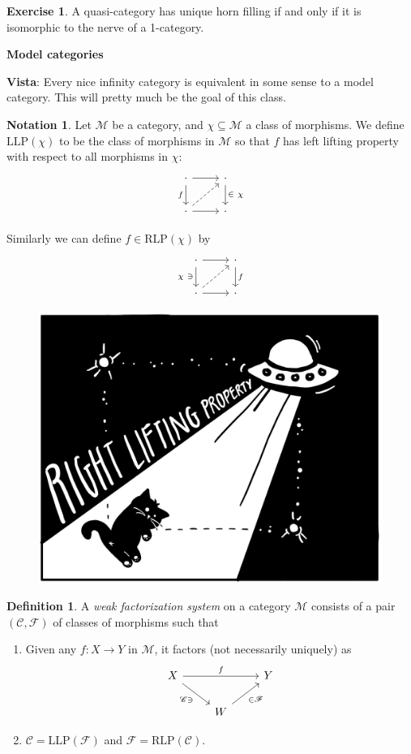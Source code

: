 \documentclass[12pt]{amsart}
\theoremstyle{definition}
\newtheorem{definition}[theorem]{Definition}
\newtheorem{exercise}[theorem]{Exercise}
\newtheorem{notation}[theorem]{Notation}
\providecommand{\LLP}{\text{LLP}}
\providecommand{\RLP}{\text{RLP}}
\begin{document}
\begin{exercise} A quasi-category has unique horn filling if and only if it is isomorphic to the nerve of a 1-category.
\end{exercise}

\begin{center}
\textbf{Model categories}
\end{center}

\textbf{Vista}: Every nice infinity category is equivalent in some sense to a model category. This will pretty much be the goal of this class.

\begin{notation} Let $\mathcal{M}$ be a category, and $\chi \subseteq \mathcal{M}$ a class of morphisms. We define $\LLP(\chi)$ to be the class of morphisms in $\mathcal{M}$ so that $f$ has left lifting property with respect to all morphisms in $\chi$:
\[\begin{tikzcd}
    \cdot\rar\dar["f" left] & \cdot\dar["\in\ \chi" right]\\
    \cdot\rar\ar[ur,dashed] & \cdot
\end{tikzcd} \]
\end{notation}

Similarly we can define $f\in \RLP(\chi)$ by
\[\begin{tikzcd}
    \cdot\rar\dar["\chi\ \ni" left] & \cdot\dar["f" right]\\
    \cdot\rar\ar[ur,dashed] & \cdot
\end{tikzcd} \]

\begin{figure}[h]
  \includegraphics[width=0.5\linewidth]{pics/rlp.jpg}
  \centering
\end{figure}


\begin{definition} A \textit{weak factorization system} on a category $\mathcal{M}$ consists of a pair $(\mathscr{C}, \mathscr{F})$ of classes of morphisms such that
\begin{enumerate}
    \item Given any $f: X \to Y$ in $\mathcal{M}$, it factors (not necessarily uniquely) as
\[ \begin{tikzcd}
    X\ar[rr,"f" above]\ar[dr,"\mathscr{C}\ni" below left] &  & Y\\
     & W\ar[ur,"\in \mathscr{F}" below right] &
\end{tikzcd} \]

    \item $\mathscr{C} = \LLP(\mathscr{F})$ and $\mathscr{F} = \RLP(\mathscr{C})$.
\end{enumerate}
\end{definition}
\end{document}
